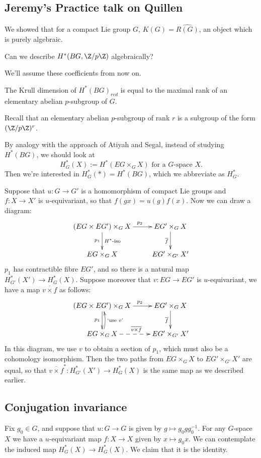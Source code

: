 \documentclass[11pt]{article}
\newcommand{\KanSemResponse}[1]
{
\thispagestyle{fancy}
\subsection*{#1}
}
\begin{document}
\begin{JeremyQuillenPractice}
\KanSemResponse
{Jeremy's Practice talk on Quillen}
We showed that for a compact Lie group $G$, $K(G)=\widehat{R(G)}$, an object which is purely algebraic.
\begin{question}
Can we describe $H^*(BG,\Z/p\Z)$ algebraically?
\end{question}
We'll assume these coefficients from now on.
\begin{conjecture}
The Krull dimension of $H^*(BG)_{red}$ is equal to the maximal rank of an elementary abelian $p$-subgroup of $G$.
\end{conjecture}
\noindent Recall that an elementary abelian $p$-subgroup of rank $r$ is a subgroup of the form $(\Z/p\Z)^r$.

By analogy with the approach of Atiyah and Segal, instead of studying $H^*(BG)$, we should look at 
\[H^*_G(X):=H^*(EG\times_G X)\text{ for a $G$-space $X$}.\]
Then we're interested in $H^*_G(\ast)=H^*(BG)$, which we abbreviate as $H_G^*$.

Suppose that $u:G\to G'$ is a homomorphism of compact Lie groups and $f:X\to X'$ is $u$-equivariant, so that $f(gx)=u(g)f(x)$. Now we can draw a diagram:
\[\xymatrix{
(EG\times EG')\times_G X\ar[r]^{\ \ \ p_2}\ar[d]_{p_1}^{\text{$H^*$-iso}}&EG'\times_GX\ar[d]_{\overline f}\\
EG\times_G X&EG'\times_{G'}X'
}\]
$p_1$ has contractible fibre $EG'$, and so there is a natural map $H^*_{G'}(X')\to H^*_{G}(X)$. Suppose moreover that $v:EG\to EG'$ is $u$-equivariant, we have a map ${\overline{v\times f}}$ as follows:
\[\xymatrix{
(EG\times EG')\times_G X\ar[r]^{\ \ \ p_2}\ar[d]_{p_1}&EG'\times_GX\ar[d]_{\overline f}\\
\ar@/_1ex/[u]_{\text{`use $v$'}}\ar@{-->}[r]^{\overline{v\times f}}EG\times_G X&EG'\times_{G'}X'
}\]
In this diagram, we use $v$ to obtain a section of $p_1$, which must also be a cohomology isomorphism. Then the two paths from $EG\times_G X$ to $EG'\times_{G'}X'$ are equal, so that $\overline{v\times f}^*:H^*_{G'}(X')\to H^*_{G}(X)$ is the same map as we described earlier.
\subsection*{Conjugation invariance}
Fix $g_0\in G$, and suppose that $u:G\to G$ is given by $g\mapsto g_0gg_0^{-1}$. For any $G$-space $X$ we have a $u$-equivariant map $f:X\to X$ given by $x\mapsto g_0x$. We can contemplate the induced map $H^*_G(X)\to H^*_G(X)$. We claim that it is the identity.


\end{JeremyQuillenPractice}
\end{document}
